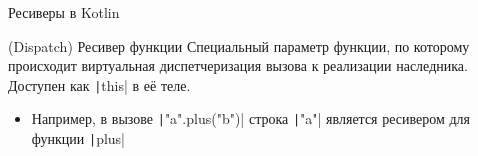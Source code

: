 \documentclass[handout,aspectratio=169,usenames,dvipsnames]{beamer}
\begin{document}
    \begin{frame}[fragile]{Ресиверы в Kotlin}
        \begin{block}{(Dispatch) Ресивер функции}
            Специальный параметр функции, по которому происходит виртуальная диспетчеризация вызова к реализации наследника.
            Доступен как \texttt|this| в её теле.
            \begin{itemize}
                \item Например, в вызове \texttt|"a".plus("b")| строка \texttt|"a"| является ресивером для функции \texttt|plus|
            \end{itemize}
        \end{block}
        \pause
    \end{frame}
\end{document}
